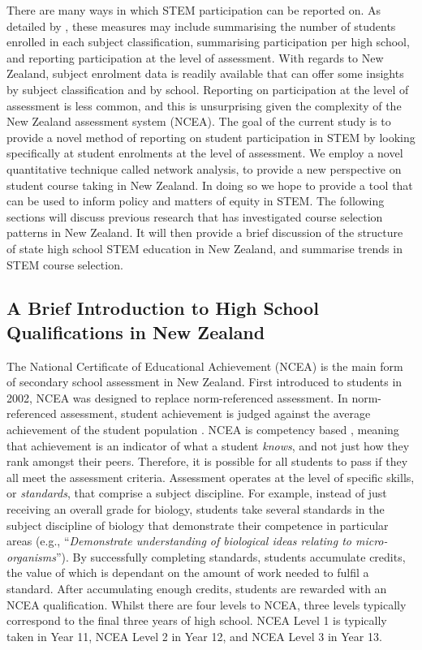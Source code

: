 \documentclass[a4paper]{article}
\begin{document}
There are many ways in which STEM participation can be reported on. As detailed by \cite{hipkins2005staying}, these measures may include summarising the number of students enrolled in each subject classification, summarising participation per high school, and reporting participation at the level of assessment. With regards to New Zealand, subject enrolment data is readily available that can offer some insights by subject classification and by school. Reporting on participation at the level of assessment is less common, and this is unsurprising given the complexity of the New Zealand assessment system (NCEA). The goal of the current study is to provide a novel method of reporting on student participation in STEM by looking specifically at student enrolments at the level of assessment. We employ a novel quantitative technique called network analysis, to provide a new perspective on student course taking in New Zealand. In doing so we hope to provide a tool that can be used to inform policy and matters of equity in STEM. The following sections will discuss previous research that has investigated course selection patterns in New Zealand. It will then provide a brief discussion of the structure of state high school STEM education in New Zealand, and summarise trends in STEM course selection.


\subsection{A Brief Introduction to High School Qualifications in New Zealand}
The National Certificate of Educational Achievement (NCEA) is the main form of secondary school assessment in New Zealand. First introduced to students in 2002, NCEA was designed to replace norm-referenced assessment. In norm-referenced assessment, student achievement is judged against the average achievement of the student population \cite{Mahoney2005}. NCEA is competency based \cite{hipkins2016ncea}, meaning that achievement is an indicator of what a student \textit{knows}, and not just how they rank amongst their peers. Therefore, it is possible for all students to pass if they all meet the assessment criteria. Assessment operates at the level of specific skills, or \textit{standards}, that comprise a subject discipline. For example, instead of just receiving an overall grade for biology, students take several standards in the subject discipline of biology that demonstrate their competence in particular areas (e.g., ``\textit{Demonstrate understanding of biological ideas relating to micro-organisms}''). By successfully completing standards, students accumulate credits, the value of which is dependant on the amount of work needed to fulfil a standard. After accumulating enough credits, students are rewarded with an NCEA qualification. Whilst there are four levels to NCEA, three levels typically correspond to the final three years of high school. NCEA Level 1 is typically taken in Year 11, NCEA Level 2 in Year 12, and NCEA Level 3 in Year 13.
\end{document}
